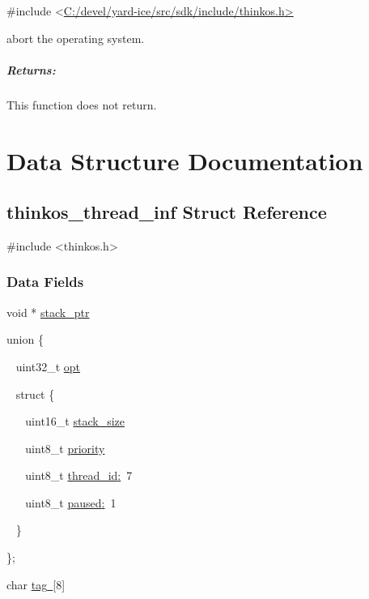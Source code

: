 {{}

{\#include
\textless{}}{\protect\hyperlink{h.pkwqa1}{C:/devel/yard-ice/src/sdk/include/thinkos.h}}{\protect\hyperlink{h.pkwqa1}{\textgreater{}}}

{abort the operating system. }

{}

\subparagraph{\texorpdfstring{{Returns:}}{Returns:}}\label{returns-54}

{This function does not return. }

{}

\section{\texorpdfstring{{Data Structure
Documentation}}{Data Structure Documentation}}\label{data-structure-documentation}

\subsection{\texorpdfstring{{thinkos\_thread\_inf Struct
Reference}}{thinkos\_thread\_inf Struct Reference}}\label{thinkos_thread_inf-struct-reference}

{}

{\#include \textless{}thinkos.h\textgreater{}}

\subsubsection{\texorpdfstring{{Data
Fields}}{Data Fields}}\label{data-fields}

{void * }{\protect\hyperlink{h.xvir7l}{stack\_ptr}}

{union \{}

{~ uint32\_t }{\protect\hyperlink{h.3hv69ve}{opt}}

{~ struct \{}

{~ ~ uint16\_t }{\protect\hyperlink{h.1x0gk37}{stack\_size}}

{~ ~ uint8\_t }{\protect\hyperlink{h.4h042r0}{priority}}

{~ ~ uint8\_t
}{\protect\hyperlink{h.2w5ecyt}{thread\_id}}{\protect\hyperlink{h.2w5ecyt}{:}}{~7}

{~ ~ uint8\_t
}{\protect\hyperlink{h.1baon6m}{paused}}{\protect\hyperlink{h.1baon6m}{:}}{~1}

{~ \} }

{\}; }

{char
}{\protect\hyperlink{h.2afmg28}{tag}}{\protect\hyperlink{h.2afmg28}{~}}{{[}8{]}}

}
